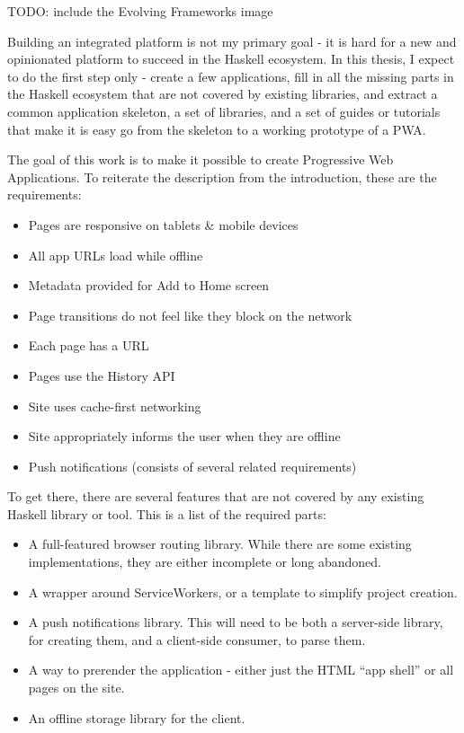 \documentclass[english,odsaz]{fitthesis}
\begin{document}
TODO: include the Evolving Frameworks image

Building an integrated platform is not my primary goal - it is hard for a new
and opinionated platform to succeed in the Haskell ecosystem. In this thesis, I
expect to do the first step only - create a few applications, fill in all the
missing parts in the Haskell ecosystem that are not covered by existing
libraries, and extract a common application skeleton, a set of libraries, and a
set of guides or tutorials that make it is easy go from the skeleton to a
working prototype of a PWA.

The goal of this work is to make it possible to create Progressive Web
Applications. To reiterate the description from the introduction, these are the
requirements:
\begin{itemize}
\item Pages are responsive on tablets \& mobile devices
\item All app URLs load while offline
\item Metadata provided for Add to Home screen
\item Page transitions do not feel like they block on the network
\item Each page has a URL
\item Pages use the History API
\item Site uses cache-first networking
\item Site appropriately informs the user when they are offline
\item Push notifications (consists of several related requirements)
\end{itemize}

To get there, there are several features that are not covered by any existing
Haskell library or tool. This is a list of the required parts:
\begin{itemize}
\item A full-featured browser routing library. While there are some existing
implementations, they are either incomplete or long abandoned.
\item A wrapper around ServiceWorkers, or a template to simplify project creation.
\item A push notifications library. This will need to be both a server-side library,
for creating them, and a client-side consumer, to parse them.
\item A way to prerender the application - either just the HTML ``app shell'' or all pages on the site.
\item An offline storage library for the client.
\end{itemize}
\end{document}
